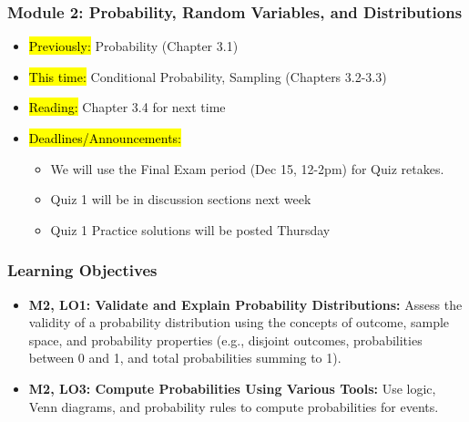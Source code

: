 
\begin{frame}
    \frametitle{Module 2: Probability, Random Variables, and Distributions}
    \begin{itemize}
        \item \hl{Previously: } Probability (Chapter 3.1)
        \item \hl{This time: } Conditional Probability, Sampling (Chapters 3.2-3.3)
        \item \hl{Reading: } Chapter 3.4 for next time
        \item \hl{Deadlines/Announcements: } 
        \begin{itemize}
            \item We will use the Final Exam period (Dec 15, 12-2pm) for Quiz retakes.
            \item Quiz 1 will be in discussion sections next week
            \item Quiz 1 Practice solutions will be posted Thursday
        \end{itemize}
    \end{itemize}
    
\end{frame}

\begin{frame}
    \frametitle{Learning Objectives}
    \begin{itemize}
        \item \textbf{M2, LO1: Validate and Explain Probability Distributions:} Assess the validity of a probability distribution using the concepts of outcome, sample space, and probability properties (e.g., disjoint outcomes, probabilities between 0 and 1, and total probabilities summing to 1).
        \item \textbf{M2, LO3: Compute Probabilities Using Various Tools:} Use logic, Venn diagrams, and probability rules to compute probabilities for events.
    \end{itemize}
\end{frame}

